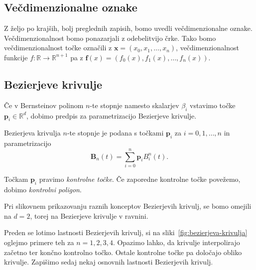 \documentclass[isrm2, tisk]{fmfdelo}
\newcommand{\R}{\mathbb R}
\newcommand{\p}{\textbf{p}}
\newcommand{\lilb}[2]{B_{#1}^{#2}(t)}
\newcommand{\bigbb}[1]{\textbf{B}_{#1}(t)}
\newcommand{\bernsteinsump}[2]{\sum_{#1=0}^{#2} \p_{#1}\lilb{#1}{#2}}
\begin{document}
    \subsection{Večdimenzionalne oznake}
    Z željo po krajših, bolj preglednih zapisih, bomo uvedli večdimenzionalne oznake.
    Večdimenzionalnost bomo ponazarjali z odebelitvijo črke.
    Tako bomo večdimenzionalnost točke označili z $\mathbf{x}=(x_0,x_1,\dots,x_n)$, večdimenzionalnost funkcije $f:\R\to\R^{n+1}$ pa z $\mathbf{f}(x)=\left( f_0(x),f_1(x),\dots,f_n(x) \right)$.

    \subsection{Bezierjeve krivulje}
    Če v Bernsteinov polinom $n$-te stopnje namesto skalarjev $\beta_i$ vstavimo točke $\p_i\in\R^d$, dobimo predpis za parametrizacijo Bezierjeve krivulje.
    \begin{definicija}
        Bezierjeva krivulja $n$-te stopnje je podana s točkami $\p_i$ za $i=0,1,\ldots,n$ in parametrizacijo
        \[\bigbb{n}=\bernsteinsump{i}{n}.\]
    \end{definicija}
    Točkam $\p_i$ pravimo \textit{kontrolne točke}.
    Če zaporedne kontrolne točke povežemo, dobimo \textit{kontrolni poligon}.
    \begin{opomba}
        Pri slikovnem prikazovanju raznih konceptov Bezierjevih krivulj, se bomo omejili na $d=2$, torej na Bezierjeve krivulje v ravnini.
    \end{opomba}
    Preden se lotimo lastnosti Bezierjevih krivulj, si na sliki~\ref{fig:bezierjeva-krivulja} oglejmo primere teh za $n=1,2,3,4$.
    Opazimo lahko, da krivulje interpolirajo začetno ter končno kontrolno točko.
    Ostale kontrolne točke pa določajo obliko krivulje.
    Zapišimo sedaj nekaj osnovnih lastnosti Bezierjevih krivulj.
\end{document}
